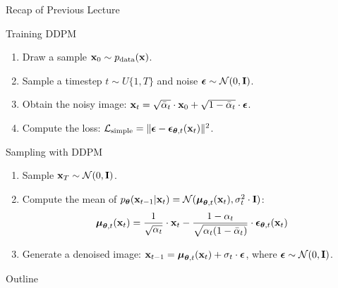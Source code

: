 \documentclass{beamer}
\begin{document}
\begin{frame}{Recap of Previous Lecture}
	\begin{block}{Training DDPM}
		\begin{enumerate}
			\item Draw a sample $\mathbf{x}_0 \sim p_{\text{data}}(\mathbf{x})$.
			\item Sample a timestep $t \sim U\{1, T\}$ and noise $\boldsymbol{\epsilon} \sim \mathcal{N}(0, \mathbf{I})$.
			\item Obtain the noisy image: $\mathbf{x}_t = \sqrt{\bar{\alpha}_t} \cdot \mathbf{x}_0 + \sqrt{1 - \bar{\alpha}_t} \cdot \boldsymbol{\epsilon}$.
			\item Compute the loss: $ \mathcal{L}_{\text{simple}} = \| \boldsymbol{\epsilon} - \boldsymbol{\epsilon}_{\boldsymbol{\theta}, t}(\mathbf{x}_t) \|^2 $.
		\end{enumerate}
	\end{block}
	\begin{block}{Sampling with DDPM}
		\begin{enumerate}
			\item Sample $\mathbf{x}_T \sim \mathcal{N}(0, \mathbf{I})$.
			\item Compute the mean of $p_{\boldsymbol{\theta}}(\mathbf{x}_{t-1} | \mathbf{x}_t) = \mathcal{N}(\boldsymbol{\mu}_{\boldsymbol{\theta}, t}(\mathbf{x}_t), \sigma_t^2 \cdot \mathbf{I})$:
			\[
				\boldsymbol{\mu}_{\boldsymbol{\theta}, t}(\mathbf{x}_t) = \frac{1}{\sqrt{\alpha_t}} \cdot \mathbf{x}_t - \frac{1 - \alpha_t}{\sqrt{\alpha_t (1 - \bar{\alpha}_t)}} \cdot \boldsymbol{\epsilon}_{\boldsymbol{\theta}, t}(\mathbf{x}_t)
			\]
			\vspace{-0.3cm}
			\item Generate a denoised image: $\mathbf{x}_{t - 1} = \boldsymbol{\mu}_{\boldsymbol{\theta}, t}(\mathbf{x}_t) +  \sigma_t \cdot \boldsymbol{\epsilon}$, where $\boldsymbol{\epsilon} \sim \mathcal{N}(0, \mathbf{I})$.
		\end{enumerate}
	\end{block}
\end{frame}
\begin{frame}{Outline}
	\tableofcontents
\end{frame}
\end{document}
